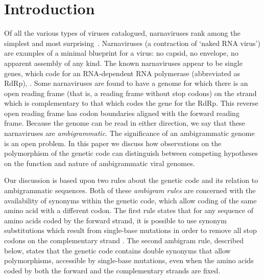\documentclass[unnumsec,webpdf,contemporary,large,namedate]{oup-authoring-template}%
\theoremstyle{thmstyleone}%
\theoremstyle{thmstyletwo}%
\theoremstyle{thmstylethree}%
\begin{document}
\section{Introduction}
\label{sec: 1}
Of all the various types of viruses catalogued, narnaviruses rank among the simplest
and most surprising~\citep{Cob+16}.  Narnaviruses (a contraction of \lq naked RNA virus')
are examples of a minimal blueprint for a virus: no capsid, no envelope, no apparent
assembly of any kind. The known narnaviruses appear to be single genes, which code for an
RNA-dependent RNA polymerase
(abbreviated as RdRp), \cite{Hillman2013}. Some narnaviruses 
are found to have a genome for which there is an open reading frame (that is, a reading frame without 
stop codons) on the strand which is complementary to that which codes the gene for the RdRp. 
This reverse open reading frame has codon boundaries aligned with the forward reading 
frame. Because the genome can be read in either direction, we say that these narnaviruses 
are \emph{ambigrammatic}. The significance of an ambigrammatic genome is an open problem. 
In this paper we discuss how observations on the polymorphism of the genetic code can distinguish 
between competing hypotheses on the function and nature of ambigrammatic viral genomes.

Our discussion is based upon two rules about the genetic code and its relation to ambigrammatic 
sequences. Both of these \emph{ambigram rules} are concerned with the availability of synonyms within 
the genetic code, which allow coding of the same amino acid with a different codon. 
The first rule states that for any sequence of amino acids coded by the forward strand, 
it is possible to use synonym substitutions which result from single-base mutations in order to remove 
all stop codons on the complementary strand \citep[this result was discussed already in][]{DeR+19}. 
The second ambigram rule, described below, states that the genetic code contains double 
synonyms that allow polymorphisms, accessible by single-base mutations, even when the 
amino acids coded by both the forward and the complementary strands are fixed. 
\end{document}

